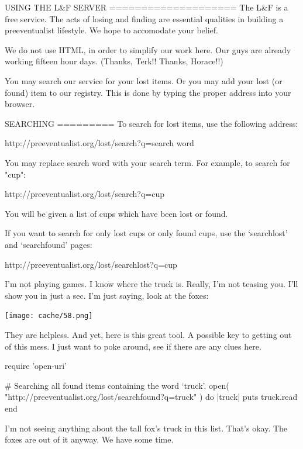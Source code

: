 \documentclass[12pt,twoside]{report}
\begin{document}
\begin{consolecode}

 USING THE L&F SERVER
 ====================
 The L&F is a free service.  The acts of losing and finding are essential
 qualities in building a preeventualist lifestyle.  We hope to accomodate your
 belief.


 We do not use HTML, in order to simplify our work here.  Our guys are already
 working fifteen hour days.  (Thanks, Terk!!  Thanks, Horace!!)


 You may search our service for your lost items.  Or you may add your lost (or
 found) item to our registry.  This is done by typing the proper address into
 your browser.

 SEARCHING
 =========
 To search for lost items, use the following address:

   http://preeventualist.org/lost/search?q={search word}

 You may replace {search word} with your search term.  For example, to search
 for "cup":

   http://preeventualist.org/lost/search?q=cup

 You will be given a list of cups which have been lost or found.

 If you want to search for only lost cups or only found cups, use the
 `searchlost' and `searchfound' pages:

   http://preeventualist.org/lost/searchlost?q=cup

\end{consolecode}


\newpage

I'm not playing games.  I know where the truck is.  Really, I'm not
teasing you.  I'll show you in just a sec.  I'm just saying, look at
the foxes:

	\texttt{[image: cache/58.png]}

They are helpless.  And yet, here is this great tool.  A possible key
to getting out of this mess. I just want to poke around, see if there
are any clues here.


\begin{rubycode}

 require 'open-uri'

 # Searching all found items containing the word `truck'.
 open( "http://preeventualist.org/lost/searchfound?q=truck" ) do |truck|
   puts truck.read
 end

\end{rubycode}


I'm not seeing anything about the tall fox's truck in this list.
That's okay. The foxes are out of it anyway.  We have some time.
\end{document}

